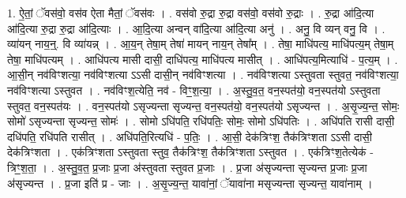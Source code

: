 \documentclass[17pt]{extarticle}
\begin{document}
1. ऐ॒तां॒ ॅवस॑वो॒ वस॑व ऐता मैतां॒ ॅवस॑वः । . वस॑वो रु॒द्रा रु॒द्रा वस॑वो॒ वस॑वो रु॒द्राः । . रु॒द्रा आ॑दि॒त्या आ॑दि॒त्या रु॒द्रा रु॒द्रा आ॑दि॒त्याः । . आ॒दि॒त्या अन्वन् वा॑दि॒त्या आ॑दि॒त्या अनु॑ । . अनु॒ वि व्यन् वनु॒ वि । . व्या॑यन् नाय॒न्॒. वि व्या॑यन्न् । . आ॒य॒न् तेषा॒म् तेषा॑ मायन् नाय॒न् तेषा᳚म् । . तेषा॒ माधि॑पत्य॒ माधि॑पत्य॒म् तेषा॒म् तेषा॒ माधि॑पत्यम् । . आधि॑पत्य मासी दासी॒ दाधि॑पत्य॒ माधि॑पत्य मासीत् । . आधि॑पत्य॒मित्याधि॑ - प॒त्य॒म् । . आ॒सी॒न् नव॑विꣳशत्या॒ नव॑विꣳशत्या ऽऽसी दासी॒न् नव॑विꣳशत्या । . नव॑विꣳशत्या ऽस्तुवता स्तुवत॒ नव॑विꣳशत्या॒ नव॑विꣳशत्या ऽस्तुवत । . नव॑विꣳश॒त्येति॒ नव॑ - विꣳ॒॒श॒त्या॒ । . अ॒स्तु॒व॒त॒ वन॒स्पत॑यो॒ वन॒स्पत॑यो ऽस्तुवता स्तुवत॒ वन॒स्पत॑यः । . वन॒स्पत॑यो ऽसृज्यन्ता सृज्यन्त॒ वन॒स्पत॑यो॒ वन॒स्पत॑यो ऽसृज्यन्त । . अ॒सृ॒ज्य॒न्त॒ सोमः॒ सोमो॑ ऽसृज्यन्ता सृज्यन्त॒ सोमः॑ । . सोमो ऽधि॑पति॒ रधि॑पतिः॒ सोमः॒ सोमो ऽधि॑पतिः । . अधि॑पति रासी दासी॒ दधि॑पति॒ रधि॑पति रासीत् । . अधि॑पति॒रित्यधि॑ - प॒तिः॒ । . आ॒सी॒ देक॑त्रिꣳश॒ तैक॑त्रिꣳशता ऽऽसी दासी॒ देक॑त्रिꣳशता । . एक॑त्रिꣳशता ऽस्तुवता स्तुव॒ तैक॑त्रिꣳश॒ तैक॑त्रिꣳशता ऽस्तुवत । . एक॑त्रिꣳश॒तेत्येक॑ - त्रिꣳ॒॒श॒ता॒ । . अ॒स्तु॒व॒त॒ प्र॒जाः प्र॒जा अ॑स्तुवता स्तुवत प्र॒जाः । . प्र॒जा अ॑सृज्यन्ता सृज्यन्त प्र॒जाः प्र॒जा अ॑सृज्यन्त । . प्र॒जा इति॑ प्र - जाः । . अ॒सृ॒ज्य॒न्त॒ यावा॑नां॒ ॅयावा॑ना मसृज्यन्ता सृज्यन्त॒ यावा॑नाम् । \newline
\end{document}

